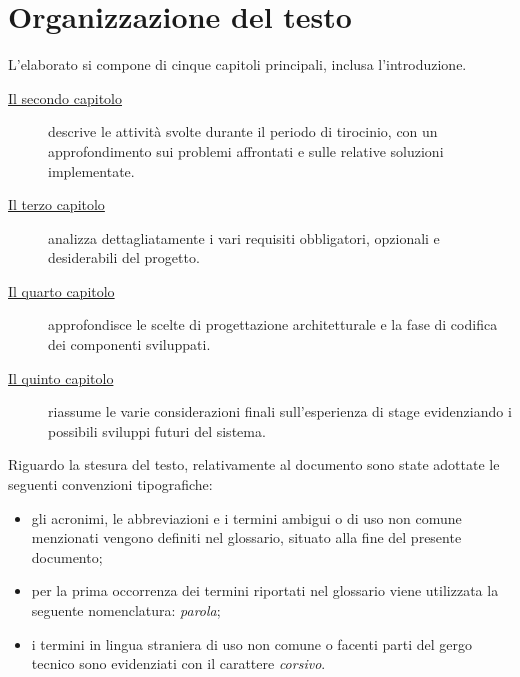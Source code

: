 \section{Organizzazione del testo}
L'elaborato si compone di cinque capitoli principali, inclusa l'introduzione.
\begin{description}
    \item[{\hyperref[cap:descrizione-stage]{Il secondo capitolo}}] descrive le attività 
    svolte durante il periodo di tirocinio, con un approfondimento sui 
    problemi affrontati e sulle relative soluzioni implementate.
    
    \item[{\hyperref[cap:analisi-requisiti]{Il terzo capitolo}}] analizza dettagliatamente 
    i vari requisiti obbligatori, opzionali e desiderabili del progetto.
    
    \item[{\hyperref[cap:progettazione-codifica]{Il quarto capitolo}}] approfondisce 
    le scelte di progettazione architetturale e la fase di codifica dei componenti 
    sviluppati.
    
    
    \item[{\hyperref[cap:conclusioni]{Il quinto capitolo}}] riassume le varie considerazioni finali
    sull'esperienza di stage evidenziando i possibili sviluppi futuri del sistema.
\end{description}

Riguardo la stesura del testo, relativamente al documento sono state adottate le seguenti convenzioni tipografiche:
\begin{itemize}
	\item gli acronimi, le abbreviazioni e i termini ambigui o di uso non comune menzionati vengono definiti nel glossario, situato alla fine del presente documento;
	\item per la prima occorrenza dei termini riportati nel glossario viene utilizzata la seguente nomenclatura: \emph{parola}\glsfirstoccur;
	\item i termini in lingua straniera di uso non comune o facenti parti del gergo tecnico sono evidenziati con il carattere \emph{corsivo}.
\end{itemize}
